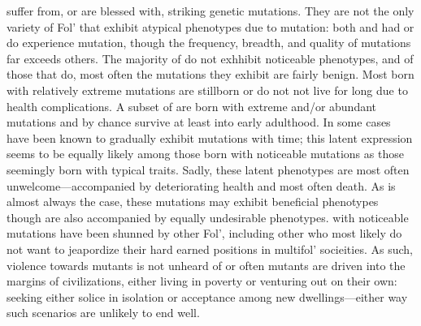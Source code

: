 \documentclass[twoside, 12pt, letterpaper]{report}\usepackage[]{graphicx}\usepackage[]{color}
\begin{document}
\begin{multicols*}{2}
\mouse suffer from, or are blessed with, striking genetic mutations. They are not the only variety of Fol' that exhibit atypical phenotypes due to mutation: both \rat and \rabbit had or do experience mutation, though the frequency, breadth, and quality of \mouse mutations far exceeds others. The majority of \mouse do not exhhibit noticeable phenotypes, and of those that do, most often the mutations they exhibit are fairly benign. Most \mouse born with relatively extreme mutations are stillborn or do not not live for long due to health complications. A subset of \mouse are born with extreme and/or abundant mutations and by chance survive at least into early adulthood. In some cases \mouse have been known to gradually exhibit mutations with time; this latent expression seems to be equally likely among those born with noticeable mutations as those seemingly born with typical traits. Sadly, these latent phenotypes are most often unwelcome---accompanied by deteriorating health and most often death. As is almost always the case, these mutations may exhibit beneficial phenotypes though are also accompanied by equally undesirable phenotypes. \mouse with noticeable mutations have been shunned by other Fol', including other \mouse who most likely do not want to jeapordize their hard earned positions in multifol' socieities. As such, violence towards mutants is not unheard of or often mutants are driven into the margins of civilizations, either living in poverty or venturing out on their own: seeking either solice in isolation or acceptance among new dwellings---either way such scenarios are unlikely to end well.


\end{multicols*}
\end{document}
